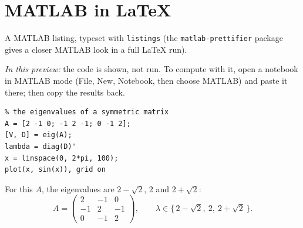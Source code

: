 \documentclass{article}
\begin{document}
\section*{MATLAB in LaTeX}

A MATLAB listing, typeset with \texttt{listings} (the \texttt{matlab-prettifier} package gives a closer MATLAB look
in a full LaTeX run).

\emph{In this preview:} the code is shown, not run. To compute with it, open a notebook in MATLAB mode (File,
New, Notebook, then choose MATLAB) and paste it there; then copy the results back.

\begin{lstlisting}
% the eigenvalues of a symmetric matrix
A = [2 -1 0; -1 2 -1; 0 -1 2];
[V, D] = eig(A);
lambda = diag(D)'
x = linspace(0, 2*pi, 100);
plot(x, sin(x)), grid on
\end{lstlisting}

For this $A$, the eigenvalues are $2 - \sqrt{2}$, $2$ and $2 + \sqrt{2}$:
\[
  A = \begin{pmatrix} 2 & -1 & 0 \\ -1 & 2 & -1 \\ 0 & -1 & 2 \end{pmatrix},
  \qquad \lambda \in \{\, 2-\sqrt{2},\ 2,\ 2+\sqrt{2} \,\}.
\]
\end{document}
